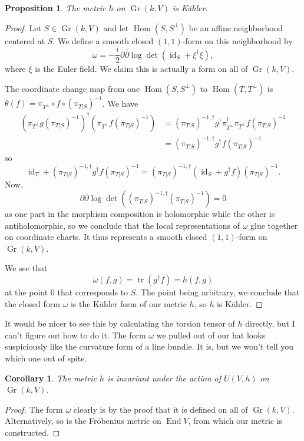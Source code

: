 \documentclass[11pt]{article}
\newtheorem{prop}[theo]{Proposition}
\newtheorem{coro}[theo]{Corollary}
\newtheorem*{proof}{Proof}
\DeclareMathOperator{\Gr}{Gr}
\DeclareMathOperator{\End}{End}
\DeclareMathOperator{\Hom}{Hom}
\DeclareMathOperator{\id}{id}
\DeclareMathOperator{\tr}{tr}
\begin{document}
\begin{prop}
The metric $h$ on $\Gr(k,V)$ is K\"ahler.
\end{prop}

\begin{proof}
Let $S \in \Gr(k,V)$ and let $\Hom(S,S^\perp)$ be an affine neighborhood centered at $S$. We define a smooth closed $(1,1)$-form on this neighborhood by
\[
\omega = -\frac i2 \partial\bar\partial \log \det (\id_S + \xi^\dagger \xi),
\]
where $\xi$ is the Euler field. We claim this is actually a form on all of $\Gr(k,V)$.

The coordinate change map from one $\Hom(S,S^\perp)$ to $\Hom(T,T^\perp)$ is $\theta(f) = \pi_{T^\perp} \circ f \circ (\pi_{T|S})^{-1}$. We have
\begin{align*}
(\pi_{T^\perp} g (\pi_{T|S})^{-1})^\dagger (\pi_{T^\perp} f (\pi_{T|S})^{-1})
&=
(\pi_{T|S})^{-1,\dagger} g^\dagger \pi_{T^\perp}^\dagger \pi_{T^\perp} f (\pi_{T|S})^{-1}
\\
&= (\pi_{T|S})^{-1,\dagger} g^\dagger f (\pi_{T|S})^{-1}
\end{align*}
so
\[
\id_T + (\pi_{T|S})^{-1,\dagger} g^\dagger f (\pi_{T|S})^{-1}
= (\pi_{T|S})^{-1,\dagger}(\id_S + g^\dagger f)  (\pi_{T|S})^{-1}.
\]
Now,
\[
\partial\bar\partial \log \det((\pi_{T|S})^{-1,\dagger}(\pi_{T|S})^{-1}) = 0
\]
as one part in the morphism composition is holomorphic while the other is antiholomorphic, so we conclude that the local representations of $\omega$ glue together on coordinate charts. It thus represents a smooth closed $(1,1)$-form on $\Gr(k,V)$.

We see that
\[
\omega(f,g)
= \tr(g^\dagger f)
= h(f, g)
\]
at the point $0$ that corresponds to $S$. The point being arbitrary, we conclude that the closed form $\omega$ is the K\"ahler form of our metric $h$, so $h$ is K\"ahler.
\end{proof}

It would be nicer to see this by calculating the torsion tensor of $h$ directly, but I can't figure out how to do it. The form $\omega$ we pulled out of our hat looks suspiciously like the curvature form of a line bundle. It is, but we won't tell you which one out of spite.

\begin{coro}
The metric $h$ is invariant under the action of $U(V,h)$ on $\Gr(k,V)$.
\end{coro}

\begin{proof}
The form $\omega$ clearly is by the proof that it is defined on all of $\Gr(k,V)$. Alternatively, so is the Fr\"obenius metric on $\End V$, from which our metric is constructed.
\end{proof}
\end{document}
